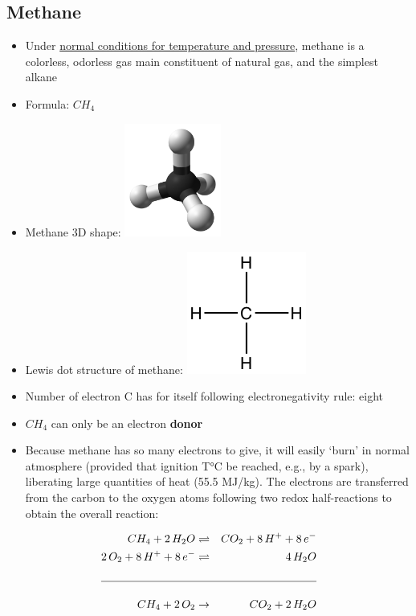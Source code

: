 \documentclass[]{book}
\providecommand{\tightlist}{%
  \setlength{\itemsep}{0pt}\setlength{\parskip}{0pt}}
\theoremstyle{definition}
\theoremstyle{definition}
\theoremstyle{definition}
\theoremstyle{remark}
\begin{document}
\subsection{Methane}\label{methane}

\begin{itemize}
\tightlist
\item
  Under
  \href{https://en.wikipedia.org/wiki/Standard_conditions_for_temperature_and_pressure}{normal
  conditions for temperature and pressure}, methane is a colorless,
  odorless gas main constituent of natural gas, and the simplest alkane
\item
  Formula: \(CH_4\)
\item
  Methane 3D shape:
  \includegraphics[width=0.25000\textwidth]{pictures/Methane-CRC-MW-3D-balls.png}
\item
  Lewis dot structure of methane:
  \includegraphics{pictures/methane_lewis_structure.png}
\item
  Number of electron C has for itself following electronegativity rule:
  eight
\item
  \(CH_4\) can only be an electron \textbf{donor}
\item
  Because methane has so many electrons to give, it will easily `burn'
  in normal atmosphere (provided that ignition T°C be reached, e.g., by
  a spark), liberating large quantities of heat (55.5 MJ/kg). The
  electrons are transferred from the carbon to the oxygen atoms
  following two redox half-reactions to obtain the overall reaction:
\end{itemize}

\begin{align}
CH_4 + 2\,H_2O & \rightleftharpoons & CO_2 + 8\,H^+ + 8\,e^-\\
2\,O_2 + 8\,H^+ + 8\,e^- & \rightleftharpoons & 4\,H_2O\\
& &\\
\hline\\
CH_4 + 2\,O_2 & \to & CO_2 + 2\,H_2O
\end{align}
\end{document}
